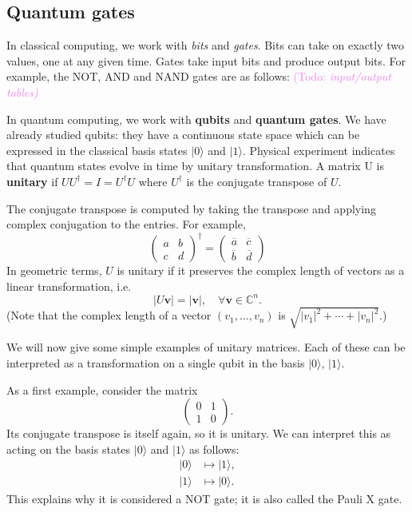 \documentclass{article}
\theoremstyle{plain}
\theoremstyle{definition}
\theoremstyle{remark}
\numberwithin{theorem}{section}
\newcommand{\KS}[1]{\textcolor{violet}{{\sf (Todo:} {\sl{#1})}}}
\newcommand{\KS}[1]{}
\newcommand{\CC}{\mathbb{C}}
\begin{document}
\subsection{Quantum gates}

In classical computing, we work with \emph{bits} and \emph{gates}.  Bits can take on exactly two values, one at any given time.  Gates take input bits and produce output bits.  For example, the NOT, AND and NAND gates are as follows:
\KS{input/output tables}

In quantum computing, we work with \textbf{qubits} and \textbf{quantum gates}.  We have already studied qubits:  they have a continuous state space which can be expressed in the classical basis states $|0\rangle$ and $|1 \rangle$.  Physical experiment indicates that quantum states evolve in time by unitary transformation.  A matrix U is \textbf{unitary} if $U U^\dagger = I = U^\dagger U$ where $U^\dagger$ is the conjugate transpose of $U$.

The conjugate transpose is computed by taking the transpose and applying complex conjugation to the entries.  For example,
\[
\begin{pmatrix}
a & b \\ c & d
\end{pmatrix}^\dagger
=
\begin{pmatrix}
\overline{a} & \overline{c} \\ \overline{b} & \overline{d}
\end{pmatrix}
\]
In geometric terms, $U$ is unitary if it preserves the complex length of vectors as a linear transformation, i.e.
\[
|U \mathbf{v} | = |\mathbf{v}|, \quad \forall \mathbf{v} \in \CC^n.
\]
(Note that the complex length of a vector $(v_1,\ldots,v_n)$ is $\sqrt{ |v_1|^2 + \cdots + |v_n|^2 }$.)

We will now give some simple examples of unitary matrices.  Each of these can be interpreted as a transformation on a single qubit in the basis $|0\rangle$, $|1\rangle$.

As a first example, consider the matrix
\[
\begin{pmatrix}
0 & 1 \\ 1 & 0
\end{pmatrix}.
\]
Its conjugate transpose is itself again, so it is unitary.  We can interpret this as acting on the basis states $|0 \rangle$ and $|1 \rangle$ as follows:
\begin{align*}
|0\rangle &\mapsto |1 \rangle, \\
|1\rangle &\mapsto |0 \rangle.
\end{align*}
This explains why it is considered a NOT gate; it is also called the Pauli X gate.
\end{document}
